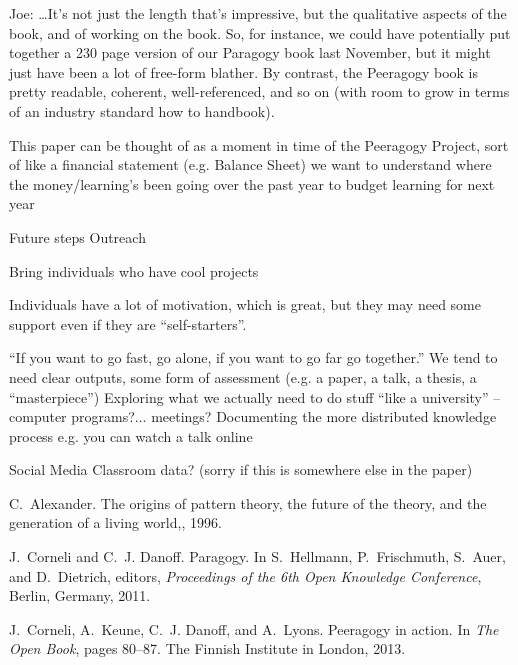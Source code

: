 \documentclass[twoside]{article}
\begin{document}
\begin{multicols}{2}
Joe: \ldots It's not just the length that's impressive, but the
qualitative aspects of the book, and of working on the book. So, for
instance, we could have potentially put together a 230 page version of
our Paragogy book last November, but it might just have been a lot of
free-form blather. By contrast, the Peeragogy book is pretty readable,
coherent, well-referenced, and so on (with room to grow in terms of an industry standard how to handbook).


This paper can be thought of as a moment in time of the Peeragogy Project, sort of like a financial statement (e.g. Balance Sheet) we want to understand where the money/learning's been going over the past year to budget learning for next year

Future steps
Outreach

Bring individuals who have cool projects

Individuals have a lot of motivation, which is great, but they may need some support even if they are ``self-starters''.

``If you want to go fast, go alone, if you want to go far go together.''
We tend to need clear outputs, some form of assessment (e.g. a paper,
a talk, a thesis, a ``masterpiece'')
Exploring what we actually need to do stuff ``like a university'' -- computer programs?... meetings?
Documenting the more distributed knowledge process
e.g. you can watch a talk online

Social Media Classroom data? (sorry if this is somewhere else in the paper)

%


\begin{thebibliography}{10}

C.~Alexander.
\newblock The origins of pattern theory, the future of the theory, and the
  generation of a living world,, 1996.

J.~Corneli and C.~J. Danoff.
\newblock Paragogy.
\newblock In S.~Hellmann, P.~Frischmuth, S.~Auer, and D.~Dietrich, editors,
  {\em Proceedings of the 6th Open Knowledge Conference}, Berlin, Germany,
  2011.

J.~Corneli, A.~Keune, C.~J. Danoff, and A.~Lyons.
\newblock Peeragogy in action.
\newblock In {\em The Open Book}, pages 80--87. The Finnish Institute in
  London, 2013.


\end{thebibliography}
\end{multicols}
\end{document}
